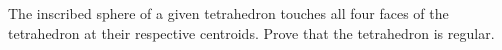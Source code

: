 The inscribed sphere of a given tetrahedron touches all four faces of the tetrahedron at their respective centroids. Prove that the tetrahedron is regular.